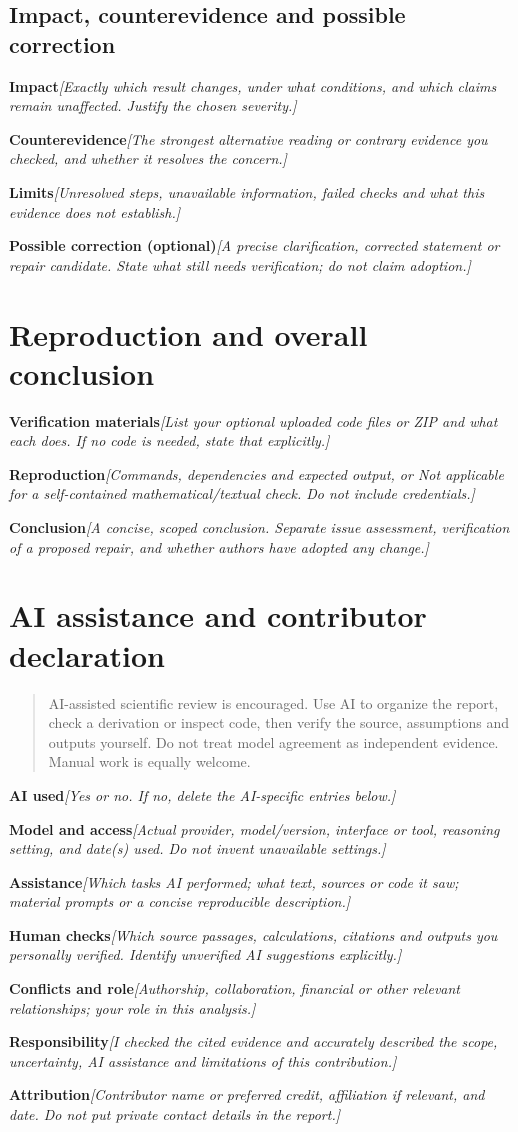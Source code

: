 \documentclass[11pt]{article}
\newcommand{\prompt}[1]{\textit{\textcolor{promptink}{[#1]}}}
\newcommand{\entry}[2]{\textbf{#1}\quad\prompt{#2}\par}
\newcommand{\guidance}[1]{\begin{quote}\small #1\end{quote}}
\begin{document}
\subsection{Impact, counterevidence and possible correction}
\entry{Impact}{Exactly which result changes, under what conditions, and which
claims remain unaffected. Justify the chosen severity.}
\entry{Counterevidence}{The strongest alternative reading or contrary evidence
you checked, and whether it resolves the concern.}
\entry{Limits}{Unresolved steps, unavailable information, failed checks and
what this evidence does not establish.}
\entry{Possible correction (optional)}{A precise clarification, corrected statement
or repair candidate. State what still needs verification; do not claim adoption.}

\section{Reproduction and overall conclusion}
\entry{Verification materials}{List your optional uploaded code files or ZIP and
what each does. If no code is needed, state that explicitly.}
\entry{Reproduction}{Commands, dependencies and expected output, or Not applicable
for a self-contained mathematical/textual check. Do not include credentials.}
\entry{Conclusion}{A concise, scoped conclusion. Separate issue assessment,
verification of a proposed repair, and whether authors have adopted any change.}

\section{AI assistance and contributor declaration}
\guidance{AI-assisted scientific review is encouraged. Use AI to organize the report,
check a derivation or inspect code, then verify the source, assumptions and outputs
yourself. Do not treat model agreement as independent evidence. Manual work is
equally welcome.}
\entry{AI used}{Yes or no. If no, delete the AI-specific entries below.}
\entry{Model and access}{Actual provider, model/version, interface or tool,
reasoning setting, and date(s) used. Do not invent unavailable settings.}
\entry{Assistance}{Which tasks AI performed; what text, sources or code it saw;
material prompts or a concise reproducible description.}
\entry{Human checks}{Which source passages, calculations, citations and outputs
you personally verified. Identify unverified AI suggestions explicitly.}
\entry{Conflicts and role}{Authorship, collaboration, financial or other relevant
relationships; your role in this analysis.}
\entry{Responsibility}{I checked the cited evidence and accurately described the
scope, uncertainty, AI assistance and limitations of this contribution.}
\entry{Attribution}{Contributor name or preferred credit, affiliation if relevant,
and date. Do not put private contact details in the report.}
\end{document}

